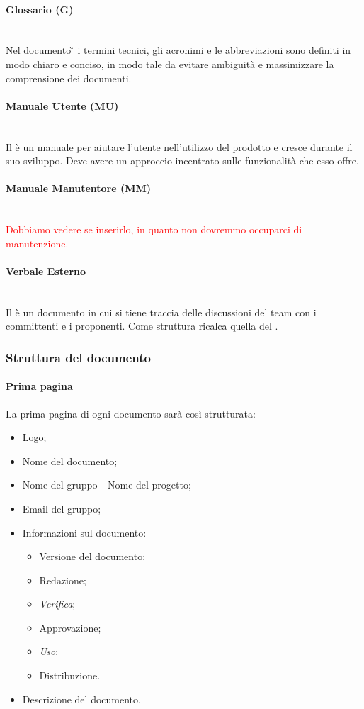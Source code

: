 	\paragraph{Glossario (G)}
	~\\Nel documento \G{} i termini tecnici, gli acronimi e le abbreviazioni sono definiti in modo chiaro e conciso, in modo tale da evitare ambiguità e massimizzare la comprensione dei documenti.
	\paragraph{Manuale Utente (MU)}
	~\\Il \MU{} è un manuale per aiutare l'utente nell'utilizzo del prodotto e cresce durante il suo sviluppo. Deve avere un approccio incentrato sulle funzionalità che esso offre.
	\paragraph{Manuale Manutentore (MM)}
	~\\\textcolor{red}{Dobbiamo vedere se inserirlo, in quanto non dovremmo occuparci di manutenzione.}
	\paragraph{Verbale Esterno}
	~\\Il \VE{} è un documento in cui si tiene traccia delle discussioni del team con i committenti e i proponenti. Come struttura ricalca quella del \VI.
	
	\subsubsection{Struttura del documento}
	\paragraph{Prima pagina}
	La prima pagina di ogni documento sarà così strutturata:
	\begin{itemize}
		\item Logo;
		\item Nome del documento;
		\item Nome del gruppo \emph{-} Nome del progetto;
		\item Email del gruppo;
		\item Informazioni sul documento:
		\begin{itemize}
			\item Versione del documento;
			\item Redazione;
			\item \emph{Verifica};
			\item Approvazione;
			\item \emph{Uso};
			\item Distribuzione.
		\end{itemize}
		\item Descrizione del documento.
	\end{itemize}
